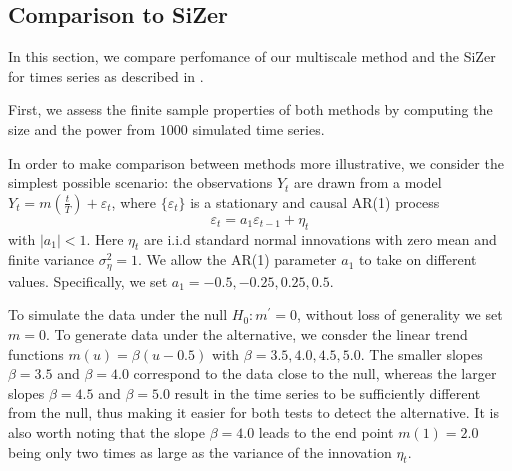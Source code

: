 \documentclass[a4paper,12pt]{article}
\begin{document}
\subsection{Comparison to SiZer}\label{subsec-sim-2}

In this section, we compare perfomance of our multiscale method and the SiZer for times series as described in \cite{Rondonotti2007}. 

First, we assess the finite sample properties of both methods by computing the size and the power from $1000$ simulated time series.

In order to make comparison between methods more illustrative, we consider the simplest possible scenario: the observations $Y_t$ are drawn from a model $Y_t = m(\frac{t}{T}) + \varepsilon_t$, where $\{\varepsilon_t\}$ is a stationary and causal AR(1) process
\[ \varepsilon_t = a_1 \varepsilon_{t - 1} + \eta_t
\]
with $|a_1| < 1$. Here $\eta_t$ are i.i.d standard normal innovations with zero mean and finite variance $\sigma_\eta^2 = 1$. We allow the AR(1) parameter $a_1$ to take on different values. Specifically, we set $a_1 = -0.5, -0.25, 0.25, 0.5$.

To simulate the data under the null $H_0: m^\prime = 0$, without loss of generality we set $ m = 0$. To generate data under the alternative, we consder the linear trend functions $m(u) = \beta (u - 0.5)$ with $\beta = 3.5, 4.0, 4.5, 5.0$. The smaller slopes $\beta = 3.5$ and $\beta = 4.0$ correspond to the data close to the null, whereas the larger slopes $\beta = 4.5$ and $\beta = 5.0$ result in the time series to be sufficiently different from the null, thus making it easier for both tests to detect the alternative. It is also worth noting that the slope $\beta = 4.0$ leads to the end point $m(1) = 2.0$ being only two times as large as the variance of the innovation $\eta_t$.
\end{document}
